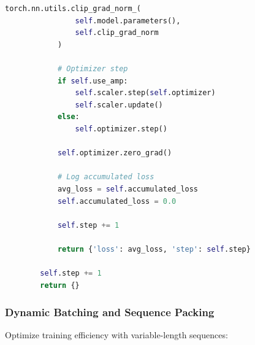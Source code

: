 \begin{lstlisting}[language=Python, caption=Gradient Accumulation with Mixed Precision]
            torch.nn.utils.clip_grad_norm_(
                self.model.parameters(),
                self.clip_grad_norm
            )

            # Optimizer step
            if self.use_amp:
                self.scaler.step(self.optimizer)
                self.scaler.update()
            else:
                self.optimizer.step()

            self.optimizer.zero_grad()

            # Log accumulated loss
            avg_loss = self.accumulated_loss
            self.accumulated_loss = 0.0

            self.step += 1

            return {'loss': avg_loss, 'step': self.step}

        self.step += 1
        return {}
\end{lstlisting}

\subsubsection{Dynamic Batching and Sequence Packing}

Optimize training efficiency with variable-length sequences:

